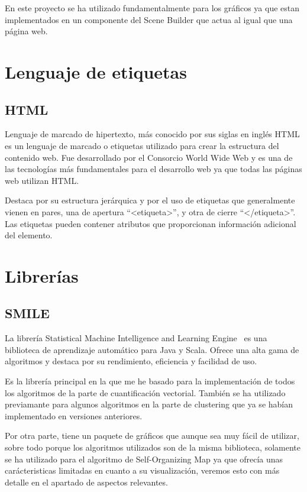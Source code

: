 En este proyecto se ha utilizado fundamentalmente para los gráficos ya que estan implementados en un componente del Scene Builder que actua al igual que una página web.

\section{Lenguaje de etiquetas}

\subsection{HTML}

Lenguaje de marcado de hipertexto, más conocido por sus siglas en inglés HTML es un lenguaje de marcado o etiquetas utilizado para crear la estructura del contenido web. Fue desarrollado por el Consorcio World Wide Web y es una de las tecnologías más fundamentales para el desarrollo web ya que todas las páginas web utilizan HTML. 

Destaca por su estructura jerárquica y por el uso de etiquetas que generalmente vienen en pares, una de apertura ``<etiqueta>'', y otra de cierre ``</etiqueta>''. Las etiquetas pueden contener atributos que proporcionan información adicional del elemento.

\section{Librerías}

\subsection{SMILE}

La librería Statistical Machine Intelligence and Learning Engine~\cite{haifengl:VectorQuantization} es una biblioteca de aprendizaje automático para Java y Scala. Ofrece una alta gama de algoritmos y destaca por su rendimiento, eficiencia y facilidad de uso.

Es la librería principal en la que me he basado para la implementación de todos los algoritmos de la parte de cuantificación vectorial. También se ha utilizado previamante para algunos algoritmos en la parte de clustering que ya se habían implementado en versiones anteriores. 

Por otra parte, tiene un paquete de gráficos que aunque sea muy fácil de utilizar, sobre todo porque los algoritmos utilizados son de la misma biblioteca, solamente se ha utilizado para el algoritmo de Self-Organizing Map ya que ofrecía unas carácteristicas limitadas en cuanto a su visualización, veremos esto con más detalle en el apartado de aspectos relevantes.

